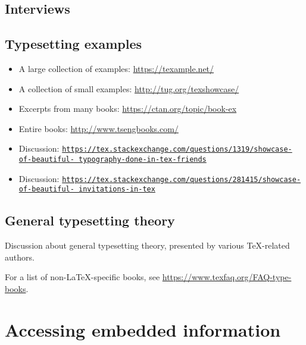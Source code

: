 \documentclass{article}
\def\\{ }%
\def\TeX{TeX}%
\def\LaTeX{LaTeX}%
\renewcommand*{\TeX}{TeX}
\renewcommand*{\LaTeX}{LaTeX}
\begin{document}
\printbibliography[
    heading=none,
    category=journals,
]


\subsection{Interviews}

\printbibliography[
    heading=none,
    category=interviews,
]


\subsection{Typesetting examples}

\begin{itemize}
\item A large collection of examples: \url{https://texample.net/}
\item A collection of small examples: \url{http://tug.org/texshowcase/}
\item Excerpts from many books: \url{https://ctan.org/topic/book-ex}
\item Entire books: \url{http://www.tsengbooks.com/}
\item Discussion: \href{https://tex.stackexchange.com/questions/1319/showcase-of-beautiful-typography-done-in-tex-friends}{\texttt{https://tex.stackexchange.com/questions/1319/showcase-of-beautiful-\\typography-done-in-tex-friends}}
\item Discussion: \href{https://tex.stackexchange.com/questions/281415/showcase-of-beautiful-invitations-in-tex}{\texttt{https://tex.stackexchange.com/questions/281415/showcase-of-beautiful-\\invitations-in-tex}}
\end{itemize}


\subsection{General typesetting theory}

Discussion about general typesetting theory,
presented by various \TeX-related authors.

For a list of non-\LaTeX-specific books, see \url{https://www.texfaq.org/FAQ-type-books}.

\printbibliography[
    heading=none,
    category=typesetting,
]


\section{Accessing embedded information}
\end{document}
